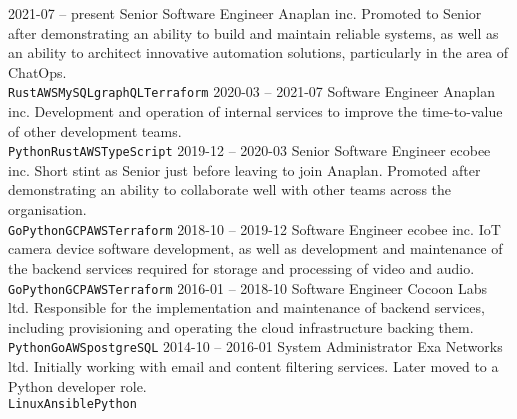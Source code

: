 \documentclass[9pt]{developercv} %
\begin{document}
\begin{entrylist}
	\entry
		{2021-07 -- present}
		{Senior Software Engineer}
		{Anaplan inc.}
		{Promoted to Senior after demonstrating an ability to build and maintain reliable systems, as well as an ability to architect innovative automation solutions, particularly in the area of ChatOps.\\
		\texttt{Rust}\slashsep\texttt{AWS}\slashsep\texttt{MySQL}\slashsep\texttt{graphQL}\slashsep\texttt{Terraform}}
	\entry
		{2020-03 -- 2021-07}
		{Software Engineer}
		{Anaplan inc.}
		{Development and operation of internal services to improve the time-to-value of other development teams.\\
		\texttt{Python}\slashsep\texttt{Rust}\slashsep\texttt{AWS}\slashsep\texttt{TypeScript}}
	\entry
		{2019-12 -- 2020-03}
		{Senior Software Engineer}
		{ecobee inc.}
		{Short stint as Senior just before leaving to join Anaplan. Promoted after demonstrating an ability to collaborate well with other teams across the organisation.\\
		\texttt{Go}\slashsep\texttt{Python}\slashsep\texttt{GCP}\slashsep\texttt{AWS}\slashsep\texttt{Terraform}}
	\entry
		{2018-10 -- 2019-12}
		{Software Engineer}
		{ecobee inc.}
		{IoT camera device software development, as well as development and maintenance of the backend services required for storage and processing of video and audio.\\
		\texttt{Go}\slashsep\texttt{Python}\slashsep\texttt{GCP}\slashsep\texttt{AWS}\slashsep\texttt{Terraform}}
	\entry
		{2016-01 -- 2018-10}
		{Software Engineer}
		{Cocoon Labs ltd.}
		{Responsible for the implementation and maintenance of backend services, including provisioning and operating the cloud infrastructure backing them.\\
		\texttt{Python}\slashsep\texttt{Go}\slashsep\texttt{AWS}\slashsep\texttt{postgreSQL}}
	\entry
		{2014-10 -- 2016-01}
		{System Administrator}
		{Exa Networks ltd.}
		{Initially working with email and content filtering services. Later moved to a Python developer role.\\
		\texttt{Linux}\slashsep\texttt{Ansible}\slashsep\texttt{Python}}
\end{entrylist}


\end{document}
